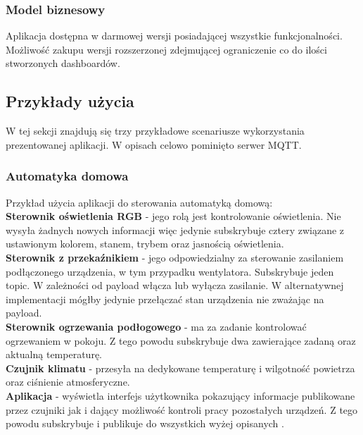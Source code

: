 \subsubsection{Model biznesowy}
Aplikacja dostępna w darmowej wersji posiadającej wszystkie funkcjonalności. Możliwość zakupu wersji rozszerzonej zdejmującej ograniczenie co do ilości stworzonych dashboardów.

\newpage

\subsection{Przykłady użycia}
W tej sekcji znajdują się trzy przykładowe scenariusze wykorzystania prezentowanej aplikacji. W opisach celowo pominięto serwer MQTT.

\subsubsection{Automatyka domowa}
Przykład użycia aplikacji do sterowania automatyką domową:\\

\textbf{Sterownik oświetlenia RGB} - jego rolą jest kontrolowanie oświetlenia. Nie wysyła żadnych nowych informacji więc jedynie subskrybuje cztery  związane z ustawionym kolorem, stanem, trybem oraz jasnością oświetlenia.\\

\textbf{Sterownik z przekaźnikiem} - jego odpowiedzialny za sterowanie zasilaniem podłączonego urządzenia, w tym przypadku wentylatora. Subskrybuje jeden topic. W zależności od payload włącza lub wyłącza zasilanie. W alternatywnej implementacji mógłby jedynie przełączać stan urządzenia nie zważając na payload.\\

\textbf{Sterownik ogrzewania podłogowego} - ma za zadanie kontrolować ogrzewaniem w pokoju. Z tego powodu subskrybuje dwa  zawierające zadaną oraz aktualną temperaturę.\\

\textbf{Czujnik klimatu} - przesyła na dedykowane  temperaturę i wilgotność powietrza oraz ciśnienie atmosferyczne.\\

\textbf{Aplikacja} - wyświetla interfejs użytkownika pokazujący informacje publikowane przez czujniki jak i dający możliwość kontroli pracy pozostałych urządzeń. Z tego powodu subskrybuje i publikuje do wszystkich wyżej opisanych .\\

